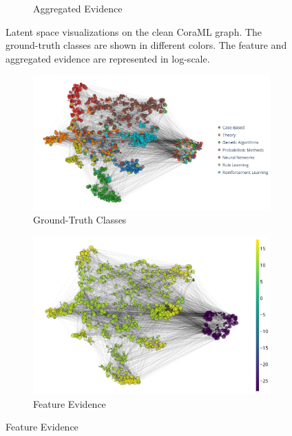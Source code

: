 \begin{figure}[!h]
\begin{subfigure}[t]{\textwidth}
		\caption{Aggregated Evidence}
		\label{subfig:latent-clean-evidence}
	\end{subfigure}
    \caption{Latent space visualizations on the clean CoraML graph. The ground-truth classes are shown in different colors. The feature and aggregated evidence are represented in log-scale.}
    \label{fig:latent-space-clean}
\end{figure}
%
\begin{figure}[!h]
    \centering
	\begin{subfigure}[t]{\textwidth}
	    \centering
		\includegraphics[height=0.25\textheight]{sections/009_neurips2021/resources/gaussian-classes.png}
		\caption{Ground-Truth Classes} 
		\label{subfig:gaussian-clean-classes}
	\end{subfigure}
	\begin{subfigure}[t]{\textwidth}
	    \centering
		\includegraphics[height=0.25\textheight]{sections/009_neurips2021/resources/gaussian-ft-evidence.png}
		\caption{Feature Evidence} 
		\label{subfig:gaussian-clean-feature-evidence}

\end{subfigure}
\end{figure}
